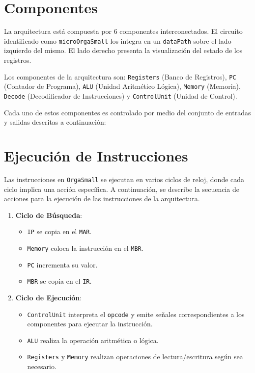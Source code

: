 \documentclass[12pt,twoside]{templates/unerthesis}
\providecommand{\tightlist}{%
  \setlength{\itemsep}{0pt}\setlength{\parskip}{0pt}}
\begin{document}
\hypertarget{componentes}{%
\section{Componentes}\label{componentes}}

La arquitectura está compuesta por 6 componentes interconectados. El circuito identificado como \texttt{microOrgaSmall} los integra en un \texttt{dataPath} sobre el lado izquierdo del mismo. El lado derecho presenta la visualización del estado de los registros.

Los componentes de la arquitectura son: \texttt{Registers} (Banco de Registros), \texttt{PC} (Contador de Programa), \texttt{ALU} (Unidad Aritmético Lógica), \texttt{Memory} (Memoria), \texttt{Decode} (Decodificador de Instrucciones) y \texttt{ControlUnit} (Unidad de Control).

Cada uno de estos componentes es controlado por medio del conjunto de entradas y salidas descritas a continuación:

\hypertarget{ejecuciuxf3n-de-instrucciones}{%
\section{Ejecución de Instrucciones}\label{ejecuciuxf3n-de-instrucciones}}

Las instrucciones en \texttt{OrgaSmall} se ejecutan en varios ciclos de reloj, donde cada ciclo implica una acción específica. A continuación, se describe la secuencia de acciones para la ejecución de las instrucciones de la arquitectura.

\begin{enumerate}
\def\labelenumi{\arabic{enumi}.}
\tightlist
\item
  \textbf{Ciclo de Búsqueda}:

  \begin{itemize}
  \tightlist
  \item
    \texttt{IP} se copia en el \texttt{MAR}.
  \item
    \texttt{Memory} coloca la instrucción en el \texttt{MBR}.
  \item
    \texttt{PC} incrementa su valor.
  \item
    \texttt{MBR} se copia en el \texttt{IR}.
  \end{itemize}
\item
  \textbf{Ciclo de Ejecución}:

  \begin{itemize}
  \tightlist
  \item
    \texttt{ControlUnit} interpreta el \texttt{opcode} y emite señales correspondientes a los componentes para ejecutar la instrucción.
  \item
    \texttt{ALU} realiza la operación aritmética o lógica.
  \item
    \texttt{Registers} y \texttt{Memory} realizan operaciones de lectura/escritura según sea necesario.
  \end{itemize}
\end{enumerate}
\end{document}

